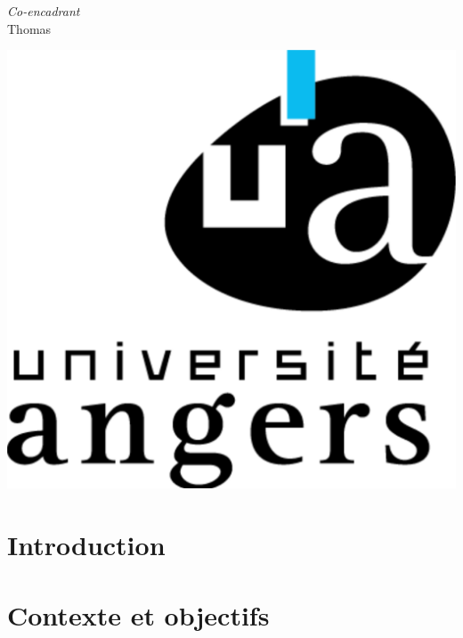 \documentclass{report}
\begin{document}
\begin{titlepage}
\begin{center}
	\vspace{0.5cm}
	\emph{Co-encadrant}\\
	Thomas \\

	\end{center}		
	
	\vspace{3.09cm}
	
	\hspace{14.4cm} \includegraphics[scale = 0.07]{images/ua.png}



    
    
\end{titlepage}

\newpage\null\thispagestyle{empty}\newpage



\newpage\null\thispagestyle{empty}\newpage

\tableofcontents

\chapter*{Introduction}
	

\newpage\null\thispagestyle{empty}\newpage


\chapter{Contexte et objectifs}
\end{document}
